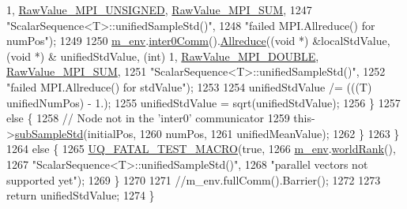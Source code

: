 \begin{DoxyCode}
       1, \hyperlink{_mpi_comm_8h_a06cbfbc33436f6e0dc8a48ff3c49bdfc}{RawValue\_MPI\_UNSIGNED}, \hyperlink{_mpi_comm_8h_afbf78d291c032aa7f512bc566cee2bd1}{RawValue\_MPI\_SUM},
1247                                    \textcolor{stringliteral}{"ScalarSequence<T>::unifiedSampleStd()"},
1248                                    \textcolor{stringliteral}{"failed MPI.Allreduce() for numPos"});
1249 
1250       \hyperlink{class_q_u_e_s_o_1_1_scalar_sequence_a71618cd6351b29361b437af68447a4c8}{m\_env}.\hyperlink{class_q_u_e_s_o_1_1_base_environment_a689e4d140c74d495d97eb498714a4b82}{inter0Comm}().\hyperlink{class_q_u_e_s_o_1_1_mpi_comm_a72e137e60ef8060efb1ee5fc874fa4b8}{Allreduce}((\textcolor{keywordtype}{void} *) &localStdValue, (\textcolor{keywordtype}{void} *) &
      unifiedStdValue, (\textcolor{keywordtype}{int}) 1, \hyperlink{_mpi_comm_8h_ad0f503bd9fecfe4e570ca3d15aaf2518}{RawValue\_MPI\_DOUBLE}, \hyperlink{_mpi_comm_8h_afbf78d291c032aa7f512bc566cee2bd1}{RawValue\_MPI\_SUM},
1251                                    \textcolor{stringliteral}{"ScalarSequence<T>::unifiedSampleStd()"},
1252                                    \textcolor{stringliteral}{"failed MPI.Allreduce() for stdValue"});
1253 
1254       unifiedStdValue /= (((T) unifiedNumPos) - 1.);
1255       unifiedStdValue = sqrt(unifiedStdValue);
1256     \}
1257     \textcolor{keywordflow}{else} \{
1258       \textcolor{comment}{// Node not in the 'inter0' communicator}
1259       this->\hyperlink{class_q_u_e_s_o_1_1_scalar_sequence_a602553eda9cecc0bd1cdaf7d6616be9f}{subSampleStd}(initialPos,
1260                          numPos,
1261                          unifiedMeanValue);
1262     \}
1263   \}
1264   \textcolor{keywordflow}{else} \{
1265     \hyperlink{_defines_8h_a56d63d18d0a6d45757de47fcc06f574d}{UQ\_FATAL\_TEST\_MACRO}(\textcolor{keyword}{true},
1266                         \hyperlink{class_q_u_e_s_o_1_1_scalar_sequence_a71618cd6351b29361b437af68447a4c8}{m\_env}.\hyperlink{class_q_u_e_s_o_1_1_base_environment_a78b57112bbd0e6dd0e8afec00b40ffa7}{worldRank}(),
1267                         \textcolor{stringliteral}{"ScalarSequence<T>::unifiedSampleStd()"},
1268                         \textcolor{stringliteral}{"parallel vectors not supported yet"});
1269   \}
1270 
1271   \textcolor{comment}{//m\_env.fullComm().Barrier();}
1272 
1273   \textcolor{keywordflow}{return} unifiedStdValue;
1274 \}
\end{DoxyCode}
